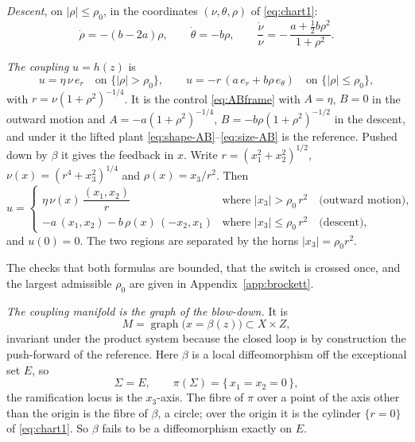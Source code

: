 \documentclass[11pt,reqno]{amsart}
\theoremstyle{plain}
\theoremstyle{definition}
\theoremstyle{remark}
\DeclareMathOperator{\graph}{graph}
\newcommand{\Sig}{\Sigma}
\begin{document}
\emph{Descent}, on $|\rho|\le\rho_0$, in the coordinates $(\nu,\theta,\rho)$ of \eqref{eq:chart1}:
\begin{equation}\label{eq:tworates}
  \dot\rho=-(b-2a)\rho,\qquad \dot\theta=-b\rho,\qquad
  \frac{\dot\nu}{\nu}=-\,\frac{a+\frac12 b\rho^{2}}{1+\rho^{2}}.
\end{equation}

\emph{The coupling} $u=h(z)$ is
\begin{equation}\label{eq:coupling}
  u=\eta\,\nu\,e_r\quad\text{on }\{|\rho|>\rho_0\},\qquad
  u=-r\,(a\,e_r+b\rho\,e_\theta)\quad\text{on }\{|\rho|\le\rho_0\},
\end{equation}
with $r=\nu(1+\rho^{2})^{-1/4}$. It is the control \eqref{eq:ABframe} with $A=\eta$, $B=0$ in the
outward motion and $A=-a(1+\rho^{2})^{-1/4}$, $B=-b\rho(1+\rho^{2})^{-1/2}$ in the descent, and under it the
lifted plant \eqref{eq:shape-AB}--\eqref{eq:size-AB} is the reference. Pushed down by
$\beta$ it gives the feedback in $x$. Write $r=(x_1^{2}+x_2^{2})^{1/2}$, $\nu(x)=(r^{4}+x_3^{2})^{1/4}$
and $\rho(x)=x_3/r^{2}$. Then
\begin{equation}\label{eq:feedback}
  u=\begin{cases}
    \eta\,\nu(x)\,\dfrac{(x_1,x_2)}{r}
      & \text{where } |x_3|>\rho_0\,r^{2}\quad\text{(outward motion)},\\[2ex]
    -a\,(x_1,x_2)-b\,\rho(x)\,(-x_2,x_1)
      & \text{where } |x_3|\le\rho_0\,r^{2}\quad\text{(descent)},
  \end{cases}
\end{equation}
and $u(0)=0$. The two regions are separated by the horns $|x_3|=\rho_0r^{2}$.

The checks that both formulas are bounded, that the switch is crossed once, and the largest admissible
$\rho_0$ are given in Appendix~\ref{app:brockett}.

\emph{The coupling manifold is the graph of the blow-down.} It is
\[
  M=\graph\bigl(x=\beta(z)\bigr)\subset X\times Z,
\]
invariant under the product system because the closed loop is by construction the
push-forward of the reference. Here $\beta$ is a local diffeomorphism off the exceptional
set $E$, so
\[
  \Sig=E,\qquad \pi(\Sig)=\{\,x_1=x_2=0\,\},
\]
the ramification locus is the $x_3$-axis. The fibre of $\pi$ over a point of the axis other than
the origin is the fibre of $\beta$, a circle; over the origin it is the cylinder $\{r=0\}$ of
\eqref{eq:chart1}. So $\beta$ fails to be a diffeomorphism exactly on $E$.
\end{document}
